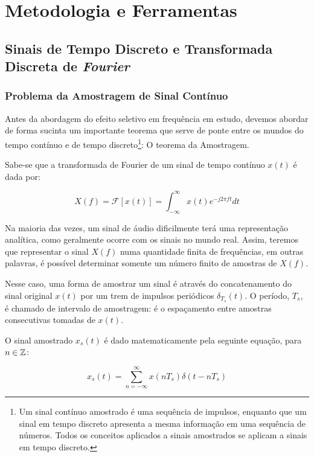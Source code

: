 \chapter{Metodologia e Ferramentas}


\section{Sinais de Tempo Discreto e Transformada Discreta de \textit{Fourier}}

	\subsection{Problema da Amostragem de Sinal Contínuo}
	\label{secao-sinal-continuo}
	
		Antes da abordagem do efeito seletivo em frequência em estudo, devemos abordar de forma sucinta um importante teorema que serve de ponte entre os mundos do tempo contínuo e de tempo discreto\footnote{Um sinal contínuo amostrado é uma sequência de impulsos, enquanto que um sinal em tempo discreto apresenta a mesma informação em uma sequência de números. Todos os conceitos aplicados a sinais amostrados se aplicam a sinais em tempo discreto.\cite{haykin2001sinais}}: O teorema da Amostragem. 
		
		Sabe-se que a transformada de Fourier de um sinal de tempo contínuo $x(t)$ é dada por:
		
		\begin{equation}
			X(f) = \mathscr{F} [x(t)] = \int_{-\infty}^{\infty}x(t)e^{-j2\pi f t}dt
			\label{eq:1}
		\end{equation}
		
		Na maioria das vezes, um sinal de áudio dificilmente terá uma representação analítica, como geralmente ocorre com os sinais no mundo real. Assim, teremos que representar o sinal $X(f)$ numa quantidade finita de frequências, em outras palavras, é possível determinar somente um número finito de amostras de $X(f)$.
		
		Nesse caso, uma forma de amostrar um sinal é através do concatenamento do sinal original $x(t)$ por um trem de impulsos periódicos $\delta_{T_s}(t)$. O período, $T_s$, é chamado de intervalo de amostragem: é o espaçamento entre amostras consecutivas tomadas de $x(t)$.
		
		O sinal amostrado $x_s(t)$ é dado matematicamente pela seguinte equação, para $n\in \mathbb{Z}$:
		
		\begin{equation}
			x_s(t) = \sum_{n=-\infty}^{\infty}x(nT_s)\delta(t-nT_s)
			\label{eq:2}
		\end{equation}
		
